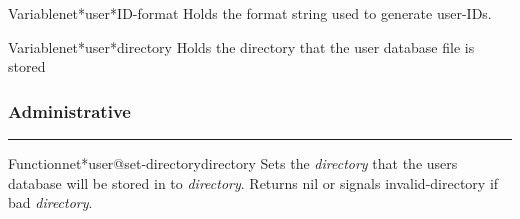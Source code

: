 \begin{functiondoc}{Variable}{net*user*ID-format}{}
Holds the format string used to generate user-IDs.
\end{functiondoc}

\begin{functiondoc}{Variable}{net*user*directory}{}
Holds the directory that the user database file is stored
\end{functiondoc}


\subsubsection*{Administrative}
\par\vspace*{0.00in}\par\hrule\par\medskip\par


\begin{functiondoc}{Function}{net*user@set-directory}{directory}
Sets the {\em directory} that the users database will be stored in to {\em directory}.
Returns nil or signals invalid-directory if bad {\em directory}.
\end{functiondoc}


